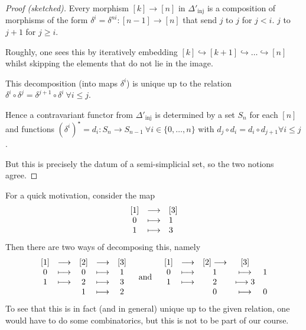 \begin{proof}[Proof (sketched)]
    Every morphism $[k] \to  [n]$ in $\Delta'_\text{inj}$ is a composition of morphisms
    of the form $\delta^i = \delta^{ni}: [n-1] \to  [n]$ that send
    $j$ to $j$ for $j < i$.
    $j$ to $j+1$ for $j \ge i$.
    
    Roughly, one sees this by iteratively embedding $[k] \hookrightarrow [k+1] \hookrightarrow  \ldots \hookrightarrow [n]$ whilst skipping the elements that do not lie in the image.

    This decomposition (into maps $δ^i$) is unique up to the relation $\delta^i \circ δ^j = \delta^{j+1} \circ \delta^i ~ \forall i \leq j$.

    Hence a contravariant functor from $\Delta'_\text{inj}$ is determined by a set $S_n$ for each $[n]$ and functions $(δ^i)^{\star} = d_i: S_n \to S_{n-1} ~ \forall i \in  \{0,\ldots,n\}$  with $d_j \circ d_i = d_i \circ d_{j+1} \forall i \le j$.

    But this is precisely the datum of a semi-simplicial set, so the two notions agree.
\end{proof}

\begin{remark*}
    For a quick motivation, consider the map
        \begin{equation*}
        \begin{array}{c c l} 
            \left[1\right] & \longrightarrow & \left[3\right] \\
        0 & \longmapsto &  1 \\
        1 & \longmapsto & 3
        \end{array}
    \end{equation*}
    Then there are two ways of decomposing this, namely
    \begin{equation*}
        \begin{array}{c c c c c}
            \left[ 1 \right] & \longrightarrow & \left[ 2 \right] & \longrightarrow & \left[ 3 \right] \\
            0 & \longmapsto & 0 & \longmapsto &1 \\
            1 & \longmapsto & 2 & \longmapsto &3 \\
              & & 1 &\longmapsto & 2
        \end{array}
        \quad \text{and} \quad
        \begin{array}{c c c c c}
            \left[ 1 \right] & \longrightarrow & \left[ 2 \right] \longrightarrow & \left[ 3 \right] \\
            0 & \longmapsto & 1 & \longmapsto & 1 \\
            1 & \longmapsto & 2 & \longmapsto 3 \\
              & & 0 & \longmapsto & 0
        \end{array}
    \end{equation*}
    To see that this is in fact (and in general) unique up to the given relation, one would have to do some combinatorics, but this is not to be part of our course.
\end{remark*}


